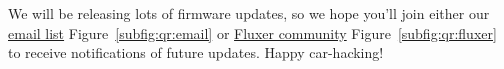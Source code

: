 \documentclass[superscriptaddress,onecolumn,floatfix]{revtex4-2}
\begin{document}
We will be releasing lots of firmware updates, so we hope you'll join either our \href{https://docs.google.com/forms/d/e/1FAIpQLSd8GtjELMu9Nn59Qep1Qt1Ey02MGxPplVcpOBm7KX2CQ7S9JQ/viewform?usp=sharing&ouid=113251294956098361139}{email list} Figure~\ref{subfig:qr:email} or \href{https://fluxer.gg/8FV7gPtN}{Fluxer community} Figure~\ref{subfig:qr:fluxer} to receive notifications of future updates. Happy car-hacking!
\end{document}
